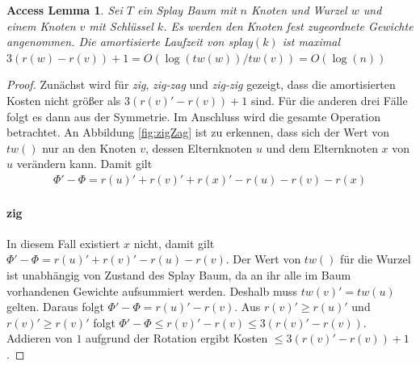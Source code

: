 \documentclass[a4paper,12pt]{article}
\begin{document}
\newtheorem{Lemma1}{Access Lemma}[section] \label{lemmaSplay}
\begin{Lemma1}Sei $T$ ein Splay Baum mit $n$ Knoten und Wurzel $w$ und einem Knoten $v$ mit Schlüssel $k$. Es werden den Knoten fest zugeordnete Gewichte angenommen. Die amortisierte Laufzeit von \textit{splay}$\left(k\right)$ ist maximal $3 \left(r\left(w\right) - r\left(v\right)\right) + 1 = O\left(\log\left(\mathit{tw}\left(w\right)\right)  / \mathit{tw}\left(v\right) \right) = O\left(\log\left(n\right)\right)$ \\
	
\end{Lemma1}
\begin{proof}
	Zunächst wird für \textit{zig}, \textit{zig-zag} und \textit{zig-zig} gezeigt, dass die amortisierten Kosten nicht größer als $3 \left(r\left(v\right)' - r\left(v\right)\right) + 1$ sind. Für die anderen drei Fälle folgt es dann aus der Symmetrie. Im Anschluss wird die gesamte Operation  betrachtet. An Abbildung  \ref{fig:zigZag} ist zu erkennen, dass sich der Wert von $\mathit{tw}\left(\right)$ nur an den Knoten $v$, dessen Elternknoten $u$  und dem Elternknoten $x$ von $u$ verändern kann.  Damit gilt
	\begin{align*}
	\Phi' - \Phi  = r\left(u\right)' +r\left(v\right)' +r\left(x\right)' - r\left(u\right)- r\left(v\right)- r\left(x\right)
	\end{align*}
	
	
	\paragraph{zig} 
	In diesem Fall existiert $x$ nicht, damit gilt\\  {$ \Phi' - \Phi  = r\left(u\right)' +r\left(v\right)' - r\left(u\right)- r\left(v\right)$}. Der Wert von $\mathit{tw}\left(\right)$ für die Wurzel ist unabhängig von Zustand des Splay Baum, da an ihr alle im Baum vorhandenen Gewichte aufsummiert werden. Deshalb muss  $\mathit{tw}\left(v\right)' =  \mathit{tw}\left(u\right)$ gelten. Daraus folgt $ \Phi' - \Phi  = r\left(u\right)'- r\left(v\right)$. Aus $r\left(v\right)' \geq r\left(u\right)'$ und $r\left(v\right)' \geq r\left(v\right)'$ folgt $ \Phi' - \Phi \leq  r\left(v\right)'- r\left(v\right) \leq 3\left(r\left(v\right)'- r\left(v\right)\right) $. Addieren von $1$ aufgrund der Rotation ergibt Kosten $\leq 3\left(r\left(v\right)'- r\left(v\right)\right) + 1$.

\end{proof}
\end{document}
